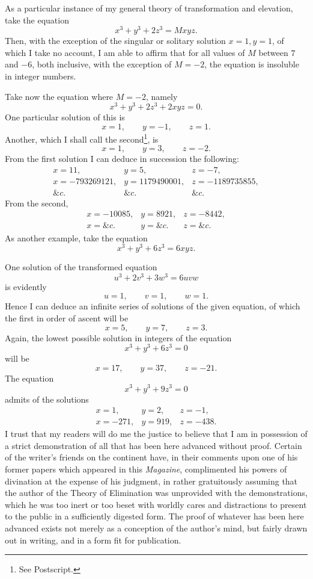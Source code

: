 \documentclass[11pt]{article}
\newcommand{\sourcepage}[1]{\marginpar{\scriptsize p.~#1}}
\begin{document}
{{As a particular instance of my general theory of transformation and elevation, take the equation
\[
x^3+y^3+2z^3=Mxyz.
\]
Then, with the exception of the singular or solitary solution $x=1,y=1$, of which I take no account, I am able to affirm that for all values of $M$ between $7$ and $-6$, both inclusive, with the exception of $M=-2$, the equation is insoluble in integer numbers.

Take now the equation where $M=-2$, namely
\[
x^3+y^3+2z^3+2xyz=0.
\]
One particular solution of this is
\[
x=1,\qquad y=-1,\qquad z=1.
\]
Another, which I shall call the second\footnote{See Postscript.}, is
\[
x=1,\qquad y=3,\qquad z=-2.
\]
From the first solution I can deduce in succession the following:
\[
\begin{array}{rrr}
x=11,& y=5,& z=-7,\\
x=-793269121,& y=1179490001,& z=-1189735855,\\
\&c.& \&c.& \&c.
\end{array}
\]
From the second,
\[
\begin{array}{rrr}
x=-10085,& y=8921,& z=-8442,\\
x=\&c.& y=\&c.& z=\&c.
\end{array}
\]
As another example, take the equation
\[
x^3+y^3+6z^3=6xyz.
\]

\sourcepage{113}
One solution of the transformed equation
\[
u^3+2v^3+3w^3=6uvw
\]
is evidently
\[
u=1,\qquad v=1,\qquad w=1.
\]
Hence I can deduce an infinite series of solutions of the given equation, of which the first in order of ascent will be
\[
x=5,\qquad y=7,\qquad z=3.
\]
Again, the lowest possible solution in integers of the equation
\[
x^3+y^3+6z^3=0
\]
will be
\[
x=17,\qquad y=37,\qquad z=-21.
\]
The equation
\[
x^3+y^3+9z^3=0
\]
admits of the solutions
\[
\begin{array}{rrr}
x=1,& y=2,& z=-1,\\
x=-271,& y=919,& z=-438.
\end{array}
\]
I trust that my readers will do me the justice to believe that I am in possession of a strict demonstration of all that has been here advanced without proof. Certain of the writer's friends on the continent have, in their comments upon one of his former papers which appeared in this \emph{Magazine}, complimented his powers of divination at the expense of his judgment, in rather gratuitously assuming that the author of the Theory of Elimination was unprovided with the demonstrations, which he was too inert or too beset with worldly cares and distractions to present to the public in a sufficiently digested form. The proof of whatever has been here advanced exists not merely as a conception of the author's mind, but fairly drawn out in writing, and in a form fit for publication.

}}
\end{document}
